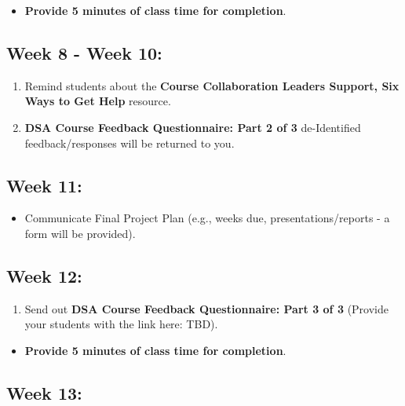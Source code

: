 \documentclass[
]{book}
\providecommand{\tightlist}{%
  \setlength{\itemsep}{0pt}\setlength{\parskip}{0pt}}
\begin{document}
\begin{itemize}
\tightlist
\item
  \textbf{Provide 5 minutes of class time for completion}.
\end{itemize}

\hypertarget{week-8---week-10}{%
\subsection{Week 8 - Week 10:}\label{week-8---week-10}}

\begin{enumerate}
\def\labelenumi{\arabic{enumi})}
\item
  Remind students about the \textbf{Course Collaboration Leaders Support, Six Ways to Get Help} resource.
\item
  \textbf{DSA Course Feedback Questionnaire: Part 2 of 3} de-Identified feedback/responses will be returned to you.
\end{enumerate}

\hypertarget{week-11}{%
\subsection{Week 11:}\label{week-11}}

\begin{itemize}
\tightlist
\item
  Communicate Final Project Plan (e.g., weeks due, presentations/reports - a form will be provided).
\end{itemize}

\hypertarget{week-12}{%
\subsection{Week 12:}\label{week-12}}

\begin{enumerate}
\def\labelenumi{\arabic{enumi})}
\tightlist
\item
  Send out { \textbf{DSA Course Feedback Questionnaire: Part 3 of 3} } (Provide your students with the link here: TBD).
\end{enumerate}

\begin{itemize}
\tightlist
\item
  \textbf{Provide 5 minutes of class time for completion}.
\end{itemize}

\hypertarget{week-13}{%
\subsection{Week 13:}\label{week-13}}
\end{document}
